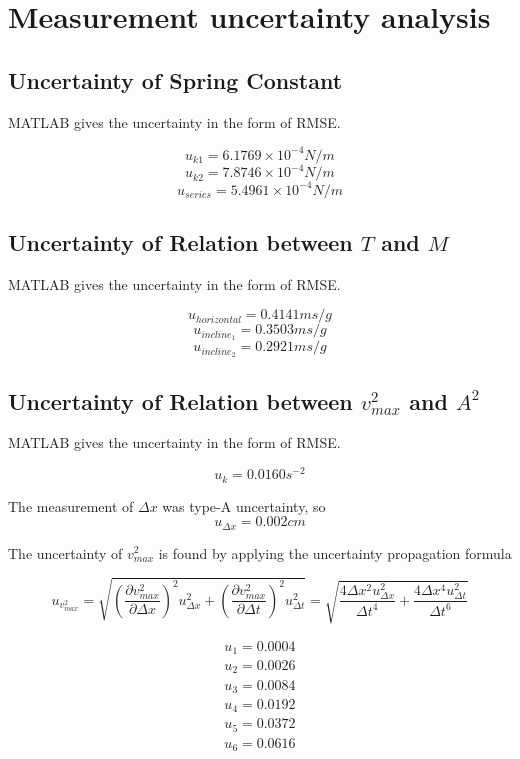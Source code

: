 \documentclass{article}
\begin{document}
\newpage

\section{Measurement uncertainty analysis}

\subsection{Uncertainty of Spring Constant}

MATLAB gives the uncertainty in the form of RMSE.

$$u_{k1}=6.1769\times10^{-4}N/m$$
$$u_{k2}=7.8746\times10^{-4}N/m$$
$$u_{series}=5.4961\times10^{-4}N/m$$

\subsection{Uncertainty of Relation between $T$ and $M$}

MATLAB gives the uncertainty in the form of RMSE.

$$u_{horizontal}=0.4141ms/g$$
$$u_{incline_1}=0.3503ms/g$$
$$u_{incline_2}=0.2921ms/g$$

\subsection{Uncertainty of Relation between $v_{max}^2$ and $A^2$}

MATLAB gives the uncertainty in the form of RMSE.

$$u_{k}=0.0160s^{-2}$$

The measurement of $\Delta x$ was type-A uncertainty, so
$$u_{\Delta x}=0.002cm$$

The uncertainty of $v_{max}^2$ is found by applying the uncertainty propagation formula

$$u_{v_{max}^2}=\sqrt{\left(\frac{\partial v_{max}^2}{\partial\Delta x}\right)^2u_{\Delta x}^2+\left(\frac{\partial v_{max}^2}{\partial\Delta t}\right)^2u_{\Delta t}^2}
=\sqrt{\frac{4\Delta x^2u_{\Delta x}^2}{\Delta t^4}+\frac{4\Delta  x^4u_{\Delta t}^2}{\Delta t^6}}$$

\begin{align*}
u_1=0.0004    \\
u_2=0.0026    \\
u_3=0.0084    \\
u_4=0.0192    \\
u_5=0.0372    \\
u_6=0.0616
\end{align*}
\end{document}
